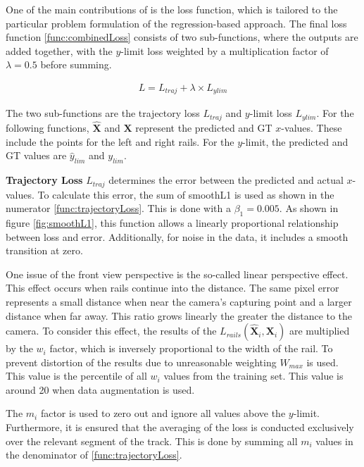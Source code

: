 One of the main contributions of \cite{tepNet2024} is the loss function, which is tailored to the particular problem formulation of the regression-based approach.
The final loss function \autoref{func:combinedLoss} \cite{tepNet2024} consists of two sub-functions, where the outputs are added together, with the $y$-limit loss weighted by a multiplication factor of $\lambda=0.5$ before summing.

\begin{align}
    L = L_{traj} + \lambda \times L_{ylim}
    \label{func:combinedLoss}
\end{align}

The two sub-functions are the trajectory loss $L_{traj}$ and $y$-limit loss $L_{ylim}$.
For the following functions, $\hat{\mathbf{X}}$ and $\mathbf{X}$ represent the predicted and \ac{GT} $x$-values.
These include the points for the left and right rails.
For the $y$-limit, the predicted and \ac{GT} values are $\hat{y}_{lim}$ and $y_{lim}$.

\textbf{Trajectory Loss} $L_{traj}$ determines the error between the predicted and actual $x$-values.
To calculate this error, the sum of smoothL1 is used as shown in the numerator \autoref{func:trajectoryLoss}.
This is done with a $\beta_{1} = 0.005$. As shown in figure \autoref{fig:smoothL1}, this function allows a linearly proportional relationship between loss and error.
Additionally, for noise in the data, it includes a smooth transition at zero.

One issue of the front view perspective is the so-called linear perspective effect.
This effect occurs when rails continue into the distance.
The same pixel error represents a small distance when near the camera's capturing point and a larger distance when far away.
This ratio grows linearly the greater the distance to the camera.
To consider this effect, the results of the $L_{rails}(\hat{\mathbf{X}}_{i},\mathbf{X}_{i})$ are multiplied by the $w_{i}$ factor, which is inversely proportional to the width of the rail.
To prevent distortion of the results due to unreasonable weighting $W_{max}$ is used.
This value is the %
percentile of all $w_{i}$ values from the training set.
This value is around 20 when data augmentation is used.

The $m_{i}$ factor is used to zero out and ignore all values above the $y$-limit.
Furthermore, it is ensured that the averaging of the loss is conducted exclusively over the relevant segment of the track.
This is done by summing all $m_{i}$ values in the denominator of \autoref{func:trajectoryLoss}.


